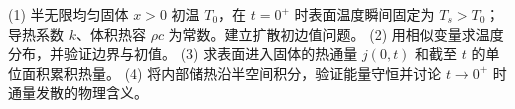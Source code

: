 (1) 半无限均匀固体 \(x>0\) 初温 \(T_0\)，在 \(t=0^+\) 时表面温度瞬间固定为 \(T_s>T_0\)；导热系数 \(k\)、体积热容 \(\rho c\) 为常数。建立扩散初边值问题。
(2) 用相似变量求温度分布，并验证边界与初值。
(3) 求表面进入固体的热通量 \(j(0,t)\) 和截至 \(t\) 的单位面积累积热量。
(4) 将内部储热沿半空间积分，验证能量守恒并讨论 \(t\to0^+\) 时通量发散的物理含义。
